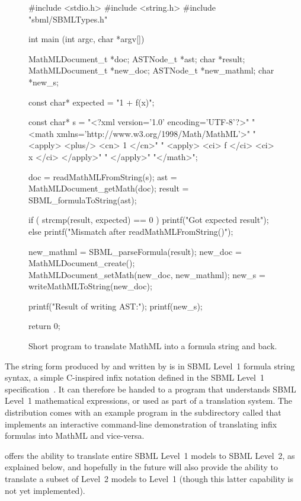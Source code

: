 \documentclass{sbmlmanual}
\begin{document}
\begin{figure}[b]
  \begin{boxedCodeVerbatim}
#include <stdio.h>
#include <string.h>
#include "sbml/SBMLTypes.h"

int
main (int argc, char *argv[])
{
    MathMLDocument_t *doc;
    ASTNode_t        *ast;
    char             *result;
    MathMLDocument_t *new_doc;
    ASTNode_t        *new_mathml;
    char             *new_s;

    const char* expected = "1 + f(x)";

    const char* s = "<?xml version='1.0' encoding='UTF-8'?>"
        "<math xmlns='http://www.w3.org/1998/Math/MathML'>"
        "  <apply> <plus/> <cn> 1 </cn>"
        "                  <apply> <ci> f </ci> <ci> x </ci> </apply>"
        "  </apply>"
        "</math>";

    doc    = readMathMLFromString(s);
    ast    = MathMLDocument_getMath(doc);
    result = SBML_formulaToString(ast);

    if ( strcmp(result, expected) == 0 ) 
    {
        printf("Got expected result\n");
    }
    else
    {
        printf("Mismatch after readMathMLFromString()\n");
    }

    new_mathml = SBML_parseFormula(result);
    new_doc    = MathMLDocument_create();
    MathMLDocument_setMath(new_doc, new_mathml);
    new_s      = writeMathMLToString(new_doc);

    printf("Result of writing AST:\n");
    printf(new_s);

    return 0;
}
  \end{boxedCodeVerbatim}
  \caption{Short program to translate MathML into a formula string and back.}
  \label{fig:eg-round-trip}
\end{figure}

The string form produced by  and written by
 is in SBML Level~1 formula string syntax, a
simple C-inspired infix notation defined in the SBML Level~1
specification~\cite{hucka_2001b}.  It can therefore be handed to a program
that understands SBML Level~1 mathematical expressions, or used as part of
a translation system.  The \libsbml{} distribution comes with an example
program in the  subdirectory called 
that implements an interactive command-line demonstration of translating
infix formulas into MathML and vice-versa.

\libsbml{} offers the ability to translate entire SBML Level~1 models to
SBML Level~2, as explained below, and hopefully in the future will also
provide the ability to translate a subset of Level~2 models to Level~1
(though this latter capability is not yet implemented).
\end{document}
